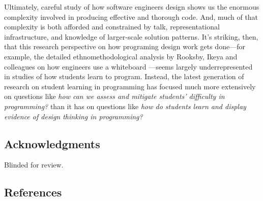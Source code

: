Ultimately, careful study of how software engineers design shows us the enormous complexity involved in producing effective and thorough code. And, much of that complexity is both afforded and constrained by talk, representational infrastructure, and knowledge of larger-scale solution patterns. It's striking, then, that this research perspective on how programing design work gets done---for example, the detailed ethnomethodological analysis by Rooksby, Ikeya and colleagues on how engineers use a whiteboard \citep{rooksby_just_2010, rooksby_collaboration_2012, ikeya_recovering_2012}---seems largely underrepresented in studies of how students learn to program. Instead, the latest generation of research on student learning in programming has focused much more extensively on questions like \emph{how can we assess and mitigate students' difficulty in programming?} than it has on questions like \emph{how do students learn and display evidence of design thinking in programming?}

\subsection{Acknowledgments}\label{acknowledgments}

Blinded for review.

\newpage{}

\subsection{References}\label{references}
